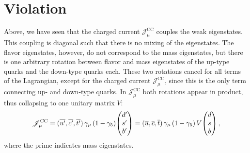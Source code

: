 \section{\texorpdfstring{\CP}{CP} Violation}
Above, we have seen that the charged current $\mathscr{J}_\mu^{\text{CC}}$ couples the weak eigenstates.
This coupling is diagonal such that there is no mixing of the eigenstates.
The flavor eigenstates, however, do not correspond to the mass eigenstates, but there is one arbitrary rotation between flavor and mass eigenstates of the up-type quarks and the down-type quarks each.
These two rotations cancel for all terms of the Lagrangian, except for the charged current $\mathscr{J}_\mu^{\text{CC}}$, since this is the only term connecting up- and down-type quarks.
In $\mathscr{J}_\mu^{\text{CC}}$ both rotations appear in product, thus collapsing to one unitary matrix $V$:
\begin{equation*}
  \mathscr{J}_\mu^{\text{CC}} = (\overline{{u}'}, \overline{{c}'}, \overline{{t}'}) \, \gamma_\mu \left(1-\gamma_5 \right) \! \begin{pmatrix} {\ensuremath{d}}' \\ {s}' \\ {b}'  \end{pmatrix} =
  ({\overline {{u}}}, {\overline {{c}}}, {\overline {{t}}}) \, \gamma_\mu \left(1-\gamma_5 \right) V \! \begin{pmatrix} {\ensuremath{d}} \\ {s} \\ {b} \end{pmatrix},
\end{equation*}
where the prime indicates mass eigenstates.

